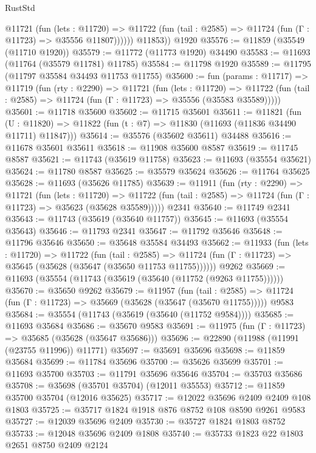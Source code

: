 \begin{lexlean}{RustStd}
\begin{coremodule}
            @11721
              (fun (lets : @11720) =>
              @11722 (fun (tail : @2585) => @11724 (fun (Γ : @11723) => @35556 @11807))))))
        @11853))
    @1920
@35576 := @11859 (@35549 (@11710 @1920))
@35579 := @11772 (@11773 @1920) @34490
@35583 := @11693 (@11764 (@35579 @11781) @11785)
@35584 := @11798 @1920
@35589 := @11795 (@11797 @35584 @34493 @11753 @11755)
@35600 := fun (params : @11717) =>
  @11719
    (fun (rty : @2290) =>
    @11721
      (fun (lets : @11720) =>
      @11722 (fun (tail : @2585) => @11724 (fun (Γ : @11723) => @35556 (@35583 @35589)))))
@35601 := @11718 @35600
@35602 := @11715 @35601
@35611 := @11821
    (fun (U : @11820) => @11822 (fun (t : @7) => @11830 (@11693 (@11836 @34490 @11711) @11847)))
@35614 := @35576 (@35602 @35611) @34488
@35616 := @11678 @35601 @35611
@35618 := @11908 @35600 @8587
@35619 := @11745 @8587
@35621 := @11743 (@35619 @11758)
@35623 := @11693 (@35554 @35621)
@35624 := @11780 @8587
@35625 := @35579 @35624
@35626 := @11764 @35625
@35628 := @11693 (@35626 @11785)
@35639 := @11911
    (fun (rty : @2290) =>
    @11721
      (fun (lets : @11720) =>
      @11722 (fun (tail : @2585) => @11724 (fun (Γ : @11723) => @35623 (@35628 @35589)))))
    @2341
@35640 := @11749 @2341
@35643 := @11743 (@35619 (@35640 @11757))
@35645 := @11693 (@35554 @35643)
@35646 := @11793 @2341
@35647 := @11792 @35646
@35648 := @11796 @35646
@35650 := @35648 @35584 @34493
@35662 := @11933
    (fun (lets : @11720) =>
    @11722
      (fun (tail : @2585) =>
      @11724 (fun (Γ : @11723) => @35645 (@35628 (@35647 (@35650 @11753 @11755))))))
    @9262
@35669 := @11693 (@35554 (@11743 (@35619 (@35640 (@11752 (@9263 @11755))))))
@35670 := @35650 @9262
@35679 := @11957
    (fun (tail : @2585) => @11724 (fun (Γ : @11723) => @35669 (@35628 (@35647 (@35670 @11755)))))
    @9583
@35684 := @35554 (@11743 (@35619 (@35640 (@11752 @9584))))
@35685 := @11693 @35684
@35686 := @35670 @9583
@35691 := @11975 (fun (Γ : @11723) => @35685 (@35628 (@35647 @35686)))
@35696 := @22890 (@11988 (@11991 (@23755 @11996)) @11771)
@35697 := @35691 @35696
@35698 := @11859 @35684
@35699 := @11784 @35696
@35700 := @35626 @35699
@35701 := @11693 @35700
@35703 := @11791 @35696 @35646
@35704 := @35703 @35686
@35708 := @35698 (@35701 @35704) (@12011 @35553)
@35712 := @11859 @35700 @35704 (@12016 @35625)
@35717 := @12022 @35696 @2409 @2409 @108 @1803
@35725 := @35717 @1824 @1918 @876 @8752 @108 @8590 @9261 @9583
@35727 := @12039 @35696 @2409
@35730 := @35727 @1824 @1803 @8752
@35733 := @12048 @35696 @2409 @1808
@35740 := @35733 @1823 @22 @1803 @2651 @8750 @2409 @2124

\end{coremodule}
\end{lexlean}
